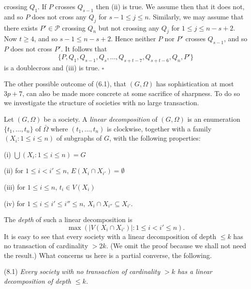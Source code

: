 \noindent crossing $Q_1$. If $P$ crosses $Q_{s-1}$ then (ii) is true. We assume then that it does not, and so $P$ does not cross any $Q_j$ for $s-1 \le j \le n$. Similarly, we may assume that there exists $P' \in \mathscr{P}$ crossing $Q_n$ but not crossing any $Q_j$ for $1 \le j \le n-s+2$. Now $t \ge 4$, and so $s-1 \le n-s+2$. Hence neither $P$ nor $P'$ crosses $Q_{s-1}$, and so $P$ does not cross $P'$. It follows that
\begin{equation*}
\{P, Q_1, Q_{s-1}, Q_s, \dots, Q_{s+t-7}, Q_{s+t-6}, Q_n, P'\}
\end{equation*}
is a doublecross and (iii) is true. $\square$


The other possible outcome of (6.1), that $(G, \Omega)$ has sophistication at most $3p+7$, can also be made more concrete at some sacrifice of sharpness. To do so we investigate the structure of societies with no large transaction.

Let $(G, \Omega)$ be a society. A \textit{linear decomposition} of $(G, \Omega)$ is an enumeration $\{t_1, \dots, t_n\}$ of $\bar{\Omega}$ where $(t_1, \dots, t_n)$ is clockwise, together with a family $(X_i: 1 \le i \le n)$ of subgraphs of $G$, with the following properties:

\hspace*{12pt}(i) $\bigcup(X_i: 1 \le i \le n) = G$

\hspace*{12pt}(ii) for $1 \le i < i' \le n$, $E(X_i \cap X_{i'}) = \emptyset$

\hspace*{12pt}(iii) for $1 \le i \le n$, $t_i \in V(X_i)$

\hspace*{12pt}(iv) for $1 \le i \le i' \le i'' \le n$, $X_i \cap X_{i''} \subseteq X_{i'}$.

The \textit{depth} of such a linear decomposition is
\begin{equation*}
\max(|V(X_i \cap X_{i'})|: 1 \le i < i' \le n).
\end{equation*}
It is easy to see that every society with a linear decomposition of depth $\le k$ has no transaction of cardinality $>2k$. (We omit the proof because we shall not need the result.) What concerns us here is a partial converse, the following.

\stmt
(8.1) \textit{Every society}  \textit{with no transaction of cardinality $>k$ has a linear decomposition of depth $\le k$.}

